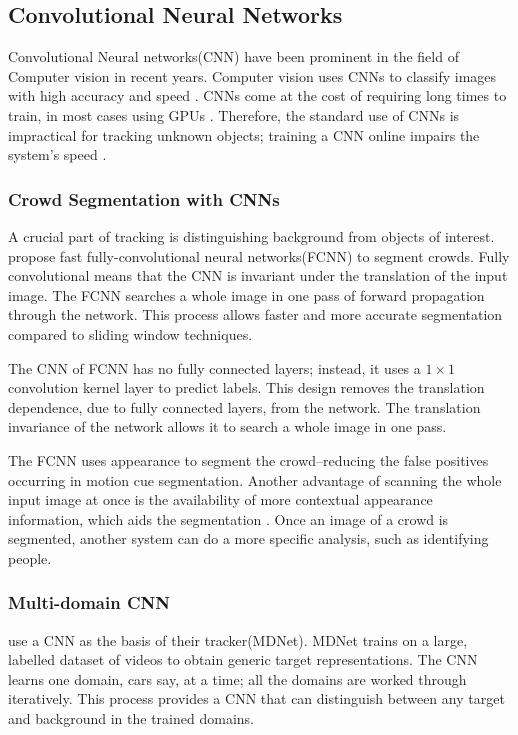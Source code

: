 \subsection{Convolutional Neural Networks}
  Convolutional Neural networks(CNN) have been prominent in the field of Computer vision in recent years.
  Computer vision uses CNNs to classify images with high accuracy and speed \cite{razavian2014}.
  CNNs come at the cost of requiring long times to train, in most cases using GPUs \cite{krizhevsky2012}.
  Therefore, the standard use of CNNs is impractical for tracking unknown objects; training a CNN online impairs the system's speed \cite{bertinetto2016}.

  \subsubsection{Crowd Segmentation with CNNs}
  A crucial part of tracking is distinguishing background from objects of interest.
  \citet{kang2014} propose fast fully-convolutional neural networks(FCNN) to segment crowds.
  Fully convolutional means that the CNN is invariant under the translation of the input image.
  The FCNN searches a whole image in one pass of forward propagation through the network.
  This process allows faster and more accurate segmentation compared to sliding window techniques.

  The CNN of FCNN has no fully connected layers; instead, it uses a $1 \times 1$ convolution kernel layer to predict labels.
  This design removes the translation dependence, due to fully connected layers, from the network.
  The translation invariance of the network allows it to search a whole image in one pass.

  The FCNN uses appearance to segment the crowd--reducing the false positives occurring in motion cue segmentation.
  Another advantage of scanning the whole input image at once is the availability of more contextual appearance information, which aids the segmentation \cite{eigenFacesRecog, farabet2012}.
  Once an image of a crowd is segmented, another system can do a more specific analysis, such as identifying people.

  \subsubsection{Multi-domain CNN}
  \citet{CNNTracking} use a CNN as the basis of their tracker(MDNet). 
  MDNet trains on a large, labelled dataset of videos to obtain generic target representations.
  The CNN learns one domain, cars say, at a time; all the domains are worked through iteratively.
  This process provides a CNN that can distinguish between any target and background in the trained domains.

